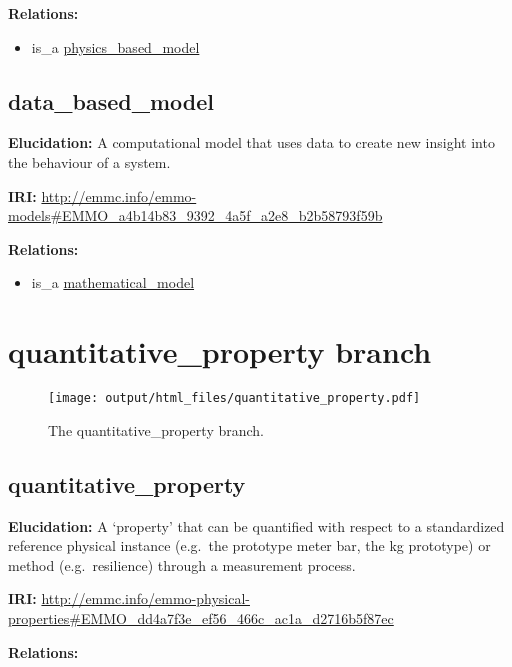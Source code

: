 \documentclass[a4paper,]{report}
\providecommand{\tightlist}{%
  \setlength{\itemsep}{0pt}\setlength{\parskip}{0pt}}
\begin{document}
\textbf{Relations:}

\begin{itemize}
\tightlist
\item
  is\_a \protect\hyperlink{physics_based_model}{physics\_based\_model}
\end{itemize}

\hypertarget{data_based_model-1}{%
\subsection{data\_based\_model}\label{data_based_model-1}}

\textbf{Elucidation:} A computational model that uses data to create new
insight into the behaviour of a system.

\textbf{IRI:}
\url{http://emmc.info/emmo-models\#EMMO_a4b14b83_9392_4a5f_a2e8_b2b58793f59b}

\textbf{Relations:}

\begin{itemize}
\tightlist
\item
  is\_a \protect\hyperlink{mathematical_model}{mathematical\_model}
\end{itemize}

\hypertarget{quantitative_property-branch}{%
\section{quantitative\_property
branch}\label{quantitative_property-branch}}

\begin{figure}
\centering
\texttt{[image: output/html\_files/quantitative\_property.pdf]}
\caption{The quantitative\_property branch.}
\end{figure}

\hypertarget{quantitative_property}{%
\subsection{quantitative\_property}\label{quantitative_property}}

\textbf{Elucidation:} A `property' that can be quantified with respect
to a standardized reference physical instance (e.g.~the prototype meter
bar, the kg prototype) or method (e.g.~resilience) through a measurement
process.

\textbf{IRI:}
\url{http://emmc.info/emmo-physical-properties\#EMMO_dd4a7f3e_ef56_466c_ac1a_d2716b5f87ec}

\textbf{Relations:}
\end{document}

